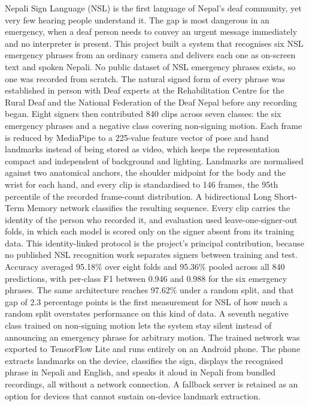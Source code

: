 Nepali Sign Language (NSL) is the first language of Nepal's deaf community, yet very few hearing people understand it. The gap is most dangerous in an emergency, when a deaf person needs to convey an urgent message immediately and no interpreter is present. This project built a system that recognises six NSL emergency phrases from an ordinary camera and delivers each one as on-screen text and spoken Nepali. No public dataset of NSL emergency phrases exists, so one was recorded from scratch. The natural signed form of every phrase was established in person with Deaf experts at the Rehabilitation Centre for the Rural Deaf and the National Federation of the Deaf Nepal before any recording began. Eight signers then contributed 840 clips across seven classes: the six emergency phrases and a negative class covering non-signing motion. Each frame is reduced by MediaPipe to a 225-value feature vector of pose and hand landmarks instead of being stored as video, which keeps the representation compact and independent of background and lighting. Landmarks are normalised against two anatomical anchors, the shoulder midpoint for the body and the wrist for each hand, and every clip is standardised to 146 frames, the 95th percentile of the recorded frame-count distribution. A bidirectional Long Short-Term Memory network classifies the resulting sequence. Every clip carries the identity of the person who recorded it, and evaluation used leave-one-signer-out folds, in which each model is scored only on the signer absent from its training data. This identity-linked protocol is the project's principal contribution, because no published NSL recognition work separates signers between training and test. Accuracy averaged 95.18\% over eight folds and 95.36\% pooled across all 840 predictions, with per-class F1 between 0.946 and 0.988 for the six emergency phrases. The same architecture reaches 97.62\% under a random split, and that gap of 2.3 percentage points is the first measurement for NSL of how much a random split overstates performance on this kind of data. A seventh negative class trained on non-signing motion lets the system stay silent instead of announcing an emergency phrase for arbitrary motion. The trained network was exported to TensorFlow Lite and runs entirely on an Android phone. The phone extracts landmarks on the device, classifies the sign, displays the recognised phrase in Nepali and English, and speaks it aloud in Nepali from bundled recordings, all without a network connection. A fallback server is retained as an option for devices that cannot sustain on-device landmark extraction.

